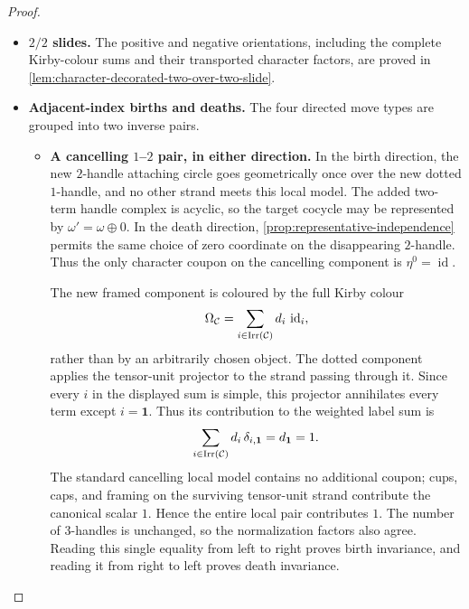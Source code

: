 \begin{proof}
\begin{itemize}
\item \textbf{\(2/2\) slides.}
The positive and negative orientations, including the complete
Kirby-colour sums and their transported character factors, are proved in
\cref{lem:character-decorated-two-over-two-slide}.

\item \textbf{Adjacent-index births and deaths.}
The four directed move types are grouped into two inverse pairs.
\begin{itemize}
  \item \textbf{A cancelling \(1\)--\(2\) pair, in either direction.}
  In the birth direction, the new \(2\)-handle attaching circle goes
  geometrically once over the new dotted \(1\)-handle, and no other strand
  meets this local model.  The added two-term handle complex is acyclic, so
  the target cocycle may be represented by \(\omega'=\omega\oplus0\).  In
  the death direction, \cref{prop:representative-independence} permits the
  same choice of zero coordinate on the disappearing \(2\)-handle.  Thus the
  only character coupon on the cancelling component is
  \(\eta^0=\operatorname{id}\).

  The new framed component is coloured by the full Kirby colour
  \[
    \Omega_{\mathcal{C}}
    =\sum_{i\in\operatorname{Irr}(\mathcal{C})}
      d_i\,\operatorname{id}_i,
  \]
  rather than by an arbitrarily chosen object.  The dotted component applies
  the tensor-unit projector to the strand passing through it.  Since every
  \(i\) in the displayed sum is simple, this projector annihilates every
  term except \(i=\mathbf1\).  Thus its contribution to the weighted label
  sum is
  \[
    \sum_{i\in\operatorname{Irr}(\mathcal{C})}
      d_i\,\delta_{i,\mathbf1}
    =d_{\mathbf1}
    =1.
  \]
  The standard cancelling local model contains no additional coupon; cups,
  caps, and framing on the surviving tensor-unit strand contribute the
  canonical scalar \(1\).  Hence the entire local pair contributes \(1\).
  The number of \(3\)-handles is unchanged, so the normalization factors
  also agree.  Reading this single equality from left to right proves birth
  invariance, and reading it from right to left proves death invariance.


\end{itemize}
\end{itemize}
\end{proof}
